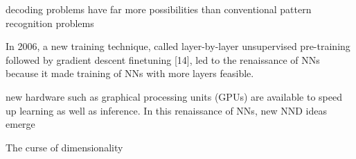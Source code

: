 \documentclass[conference]{IEEEtran}
\begin{document}
decoding problems have far more possibilities than conventional pattern recognition problems

In 2006, a new training technique, called layer-by-layer
unsupervised pre-training followed by gradient descent finetuning [14], led to the renaissance of NNs because it made
training of NNs with more layers feasible.

new hardware such as graphical processing units (GPUs) are available
to speed up learning as well as inference. In this renaissance
of NNs, new NND ideas emerge

The curse of dimensionality

\begin{comment}

\subsection{Figures and Tables}


\begin{table}[htbp]
\caption{Table Type Styles}
\begin{center}
\begin{tabular}{|c|c|c|c|}
\hline
\textbf{Table}&\multicolumn{3}{|c|}{\textbf{Table Column Head}} \\
\cline{2-4} 
\textbf{Head} & \textbf{\textit{Table column subhead}}& \textbf{\textit{Subhead}}& \textbf{\textit{Subhead}} \\
\hline
copy& More table copy$^{\mathrm{a}}$& &  \\
\hline
\multicolumn{4}{l}{$^{\mathrm{a}}$Sample of a Table footnote.}
\end{tabular}
\label{tab1}
\end{center}
\end{table}


\begin{figure}[htbp]
\centerline{\texttt{[image: fig1.png]}}
\caption{Example of a figure caption.}
\label{fig}
\end{figure}
\end{comment}
\end{document}

